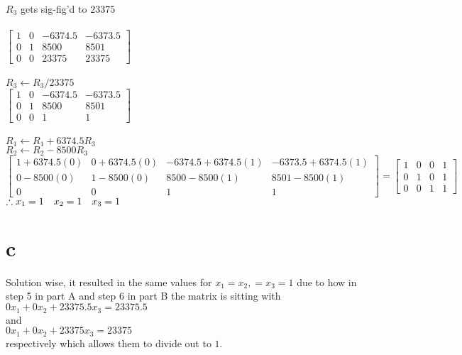 \documentclass{article}
\begin{document}
    $R_3$ gets sig-fig'd to $23375$\\\\
    $\begin{bmatrix}
        1 & 0 & -6374.5 & -6373.5 \\
        0 & 1 & 8500 & 8501 \\
        0 & 0 & 23375 & 23375
    \end{bmatrix}$\\\\

    $R_3 \leftarrow R_3 / 23375$\\
    $\begin{bmatrix}
        1 & 0 & -6374.5 & -6373.5 \\
        0 & 1 & 8500 & 8501 \\
        0 & 0 & 1 & 1
    \end{bmatrix}$\\\\

    $R_1 \leftarrow R_1 + 6374.5R_3$\\
    $R_2 \leftarrow R_2 - 8500R_3$\\
     $\begin{bmatrix}
        1 + 6374.5(0) & 0 + 6374.5(0) & -6374.5 + 6374.5(1) & -6373.5 + 6374.5(1) \\
        0 - 8500(0) & 1 - 8500(0) & 8500 - 8500(1) & 8501 - 8500(1) \\
        0 & 0 & 1 & 1
    \end{bmatrix}
    =\begin{bmatrix}
    1&0&0&1 \\
    0&1&0&1 \\
    0&0&1&1
    \end{bmatrix}$\\

    $\therefore\\ x_1 = 1 \ \ \ x_2 = 1 \ \ \  x_3 = 1$
\section*{c}
Solution wise, it resulted in the same values for $x_1 = x_2, = x_3 = 1$ due to how in step 5 in part A and step 6 in part B the matrix is sitting with \\$0x_1 + 0x_2 + 23375.5x_3 = 23375.5$\\ and\\ $0x_1 + 0x_2 + 23375x_3 = 23375$\\ respectively which allows them to divide out to $1$.
\end{document}

